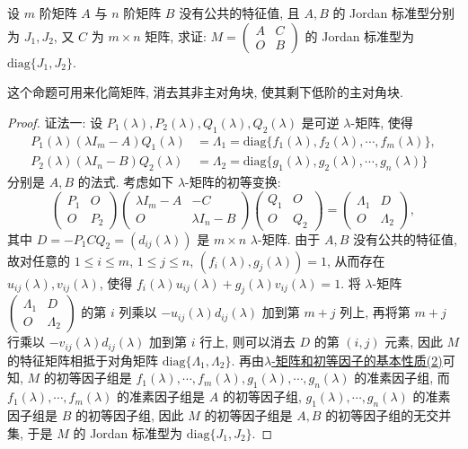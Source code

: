 \documentclass[../../main.tex]{subfiles}%
\begin{document}
\begin{proposition}\label{proposition:分块上三角阵的Jordan标准型}
设 $m$ 阶矩阵 $A$ 与 $n$ 阶矩阵 $B$ 没有公共的特征值, 且 $A,B$ 的 Jordan 标准型分别为 $J_1,J_2$, 又 $C$ 为 $m \times n$ 矩阵, 求证: $M = \begin{pmatrix}A & C \\ O & B\end{pmatrix}$ 的 Jordan 标准型为 $\mathrm{diag}\{J_1,J_2\}$.
\end{proposition}
\begin{remark}
这个命题可用来化简矩阵, 消去其非主对角块, 使其剩下低阶的主对角块. 
\end{remark}
\begin{proof}

{\color{blue}证法一:}
设 $P_1(\lambda),P_2(\lambda),Q_1(\lambda),Q_2(\lambda)$ 是可逆 $\lambda$-矩阵, 使得
\begin{align*}
P_1(\lambda)(\lambda I_m - A)Q_1(\lambda) &= \Lambda_1 = \mathrm{diag}\{f_1(\lambda),f_2(\lambda),\cdots,f_m(\lambda)\},\\
P_2(\lambda)(\lambda I_n - B)Q_2(\lambda) &= \Lambda_2 = \mathrm{diag}\{g_1(\lambda),g_2(\lambda),\cdots,g_n(\lambda)\}
\end{align*}
分别是 $A,B$ 的法式. 考虑如下 $\lambda$-矩阵的初等变换:
\[
\begin{pmatrix}P_1 & O \\ O & P_2\end{pmatrix}
\begin{pmatrix}\lambda I_m - A & -C \\ O & \lambda I_n - B\end{pmatrix}
\begin{pmatrix}Q_1 & O \\ O & Q_2\end{pmatrix}
=
\begin{pmatrix}\Lambda_1 & D \\ O & \Lambda_2\end{pmatrix},
\]
其中 $D = -P_1CQ_2 = (d_{ij}(\lambda))$ 是 $m \times n$ $\lambda$-矩阵. 由于 $A,B$ 没有公共的特征值, 故对任意的 $1 \leqslant  i \leqslant  m$, $1 \leqslant  j \leqslant  n$, $(f_i(\lambda),g_j(\lambda)) = 1$, 从而存在 $u_{ij}(\lambda),v_{ij}(\lambda)$, 使得 $f_i(\lambda)u_{ij}(\lambda) + g_j(\lambda)v_{ij}(\lambda) = 1$. 将 $\lambda$-矩阵 $\begin{pmatrix}\Lambda_1 & D \\ O & \Lambda_2\end{pmatrix}$ 的第 $i$ 列乘以 $-u_{ij}(\lambda)d_{ij}(\lambda)$ 加到第 $m + j$ 列上, 再将第 $m + j$ 行乘以 $-v_{ij}(\lambda)d_{ij}(\lambda)$ 加到第 $i$ 行上, 则可以消去 $D$ 的第 $(i,j)$ 元素, 因此 $M$ 的特征矩阵相抵于对角矩阵 $\mathrm{diag}\{\Lambda_1,\Lambda_2\}$. 再由\hyperref[theorem:lambda-矩阵和初等因子的基本性质]{$\lambda$-矩阵和初等因子的基本性质(2)}可知, $M$ 的初等因子组是 $f_1(\lambda),\cdots,f_m(\lambda),g_1(\lambda),\cdots,g_n(\lambda)$ 的准素因子组, 而 $f_1(\lambda),\cdots,f_m(\lambda)$ 的准素因子组是 $A$ 的初等因子组, $g_1(\lambda),\cdots,g_n(\lambda)$ 的准素因子组是 $B$ 的初等因子组, 因此 $M$ 的初等因子组是 $A,B$ 的初等因子组的无交并集, 于是 $M$ 的 Jordan 标准型为 $\mathrm{diag}\{J_1,J_2\}$.


\end{proof}
\end{document}
